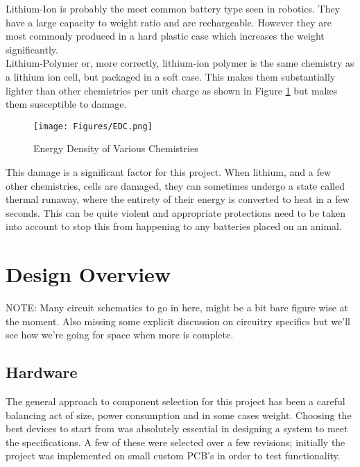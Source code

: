 \documentclass[12pt,openany,a4paper]{book}
\begin{document}
			Lithium-Ion is probably the most common battery type seen in robotics. They have a large capacity to weight ratio and are rechargeable. However they are most commonly produced in a hard plastic case which increases the weight significantly. \\
			
			Lithium-Polymer or, more correctly, lithium-ion polymer is the same chemistry as a lithium ion cell, but packaged in a soft case. This makes them substantially lighter than other chemistries per unit charge as shown in Figure \ref{fig:BAT} but makes them susceptible to damage. \\
			
			\begin{figure}[H]
				\centering
				\texttt{[image: Figures/EDC.png]}
				\caption{Energy Density of Various Chemistries \cite{icc}}
				\label{fig:BAT}
			\end{figure}		
	
			This damage is a significant factor for this project. When lithium, and a few other chemistries, cells are damaged, they can sometimes undergo a state called thermal runaway, where the entirety of their energy is converted to heat in a few seconds. This can be quite violent and appropriate protections need to be taken into account to stop this from happening to any batteries placed on an animal.

\chapter{Design Overview}
	NOTE: Many circuit schematics to go in here, might be a bit bare figure wise at the moment. Also missing some explicit discussion on circuitry specifics but we'll see how we're going for space when more is complete. \\ \noindent\makebox[\linewidth]{\rule{\paperwidth}{0.4pt}}
	\noindent\makebox[\linewidth]{\rule{\paperwidth}{0.4pt}}
	\section{Hardware} \label{sec:components}
		The general approach to component selection for this project has been a careful balancing act of size, power consumption and in some cases weight. Choosing the best devices to start from was absolutely essential in designing a system to meet the specifications. A few of these were selected over a few revisions; initially the project was implemented on small custom PCB's in order to test functionality. \\
		
\end{document}
